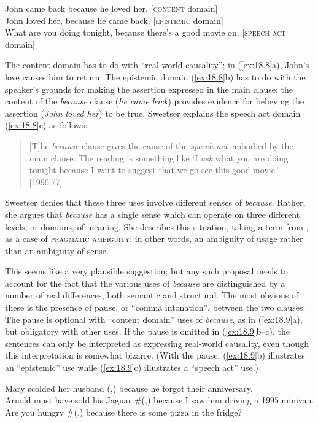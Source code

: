 \ea \label{ex:18.8}
\ea  John came back because he loved her.   [\textsc{content} domain]\\
\ex John loved her, because he came back.   [\textsc{epistemic} domain]\\
\ex What are you doing tonight, because there’s a good movie on. [\textsc{speech act} domain]
                       \z
\z


The content domain has to do with “real-world causality”; in (\ref{ex:18.8}a), John’s love causes him to return. The epistemic domain (\ref{ex:18.8}b) has to do with the speaker’s grounds for making the assertion expressed in the main clause: the content of the \textit{because} clause (\textit{he came back}) provides evidence for believing the assertion (\textit{John loved her}) to be true. Sweetser explains the speech act domain (\ref{ex:18.8}c) as follows:


\begin{quote}
{}[T]he \textit{because} clause gives the cause of the \textit{speech act} embodied by the main clause. The reading is something like ‘I \textit{ask} what you are doing tonight because I want to suggest that we go see this good movie.’ [1990:77]
\end{quote}


Sweetser denies that these three uses involve different senses of \textit{because}. Rather, she argues that \textit{because} has a single sense which can operate on three different levels, or domains, of meaning. She describes this situation, taking a term from \citet{Horn1985}, as a case of \textsc{pragmatic ambiguity}; in other words, an ambiguity of usage rather than an ambiguity of sense.



This seems like a very plausible suggestion; but any such proposal needs to account for the fact that the various uses of \textit{because} are distinguished by a number of real differences, both semantic and structural. The most obvious of these is the presence of pause, or “comma intonation”, between the two clauses. The pause is optional with “content domain” uses of \textit{because}, as in (\ref{ex:18.9}a), but obligatory with other uses. If the pause is omitted in (\ref{ex:18.9}b--c), the sentences can only be interpreted as expressing real-world causality, even though this interpretation is somewhat bizarre. (With the pause, (\ref{ex:18.9}b) illustrates an “epistemic” use while (\ref{ex:18.9}c) illustrates a “speech act” use.)


\ea \label{ex:18.9}
\ea  Mary scolded her husband (,) because he forgot their anniversary.\\
\ex Arnold must have sold his Jaguar \#(,) because I saw him driving a 1995 minivan.\\
\ex Are you hungry \#(,) because there is some pizza in the fridge?
                       \z
\z


